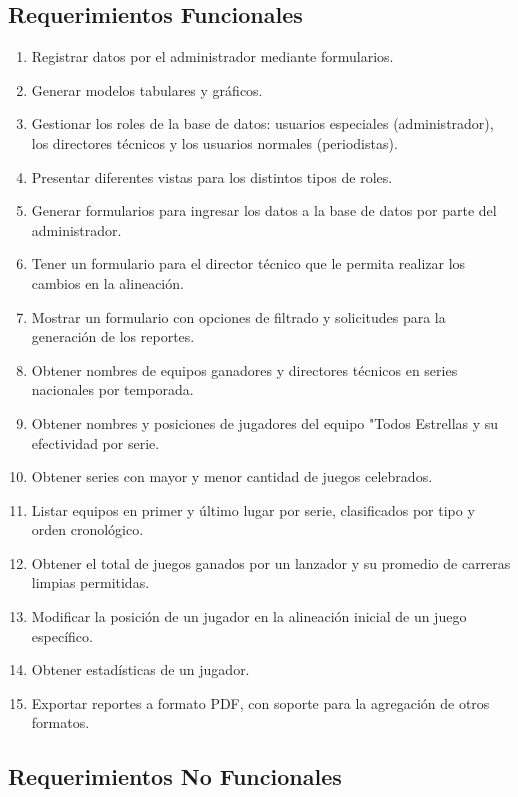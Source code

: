 \documentclass{report}
\begin{document}
    \subsection*{Requerimientos Funcionales}
    \begin{enumerate}
        \item Registrar datos por el administrador mediante formularios.
        \item Generar modelos tabulares y gr\'aficos.
        \item Gestionar los roles de la base de datos: usuarios especiales (administrador), los directores técnicos y 
        los usuarios normales (periodistas).
        \item Presentar diferentes vistas para los distintos tipos de roles.
        \item Generar formularios para ingresar los datos a la base de datos por parte del administrador.
        \item Tener un formulario para el director técnico que le permita realizar los cambios en la alineación.
        \item Mostrar un formulario con opciones de filtrado y solicitudes para la generaci\'on de los reportes.
        \item Obtener nombres de equipos ganadores y directores técnicos en series nacionales por temporada.
        \item Obtener nombres y posiciones de jugadores del equipo "Todos Estrellas y su efectividad por serie.
        \item Obtener series con mayor y menor cantidad de juegos celebrados.
        \item Listar equipos en primer y último lugar por serie, clasificados por tipo y orden cronológico.
        \item Obtener el total de juegos ganados por un lanzador y su promedio de carreras limpias permitidas.
        \item Modificar la posición de un jugador en la alineación inicial de un juego específico.
        \item Obtener estadísticas de un jugador.
        \item Exportar reportes a formato PDF, con soporte para la agregación de otros formatos.
    \end{enumerate}

    \subsection*{Requerimientos No Funcionales}
\end{document}
